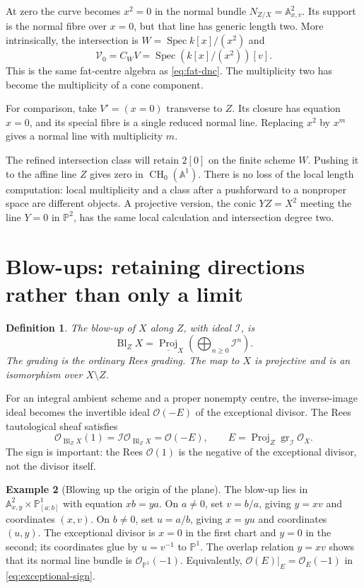 \documentclass[11pt,a4paper]{article}
\numberwithin{equation}{section}
\newtheorem{definition}{Definition}[section]
\theoremstyle{definition}
\newtheorem{example}[definition]{Example}
\newcommand{\A}{\mathbb A}
\newcommand{\PP}{\mathbb P}
\newcommand{\OO}{\mathcal O}
\newcommand{\Spec}{\operatorname{Spec}}
\newcommand{\Proj}{\operatorname{Proj}}
\newcommand{\gr}{\operatorname{gr}}
\newcommand{\Bl}{\operatorname{Bl}}
\newcommand{\CH}{\operatorname{CH}}
\begin{document}
At zero the curve becomes $x^2=0$ in the normal bundle
$N_{Z/X}=\A^2_{x,v}$. Its support is the normal fibre over $x=0$,
but that line has generic length two. More intrinsically, the
intersection is $W=\Spec k[x]/(x^2)$ and
\[
\mathcal V_0=C_WV=\Spec(k[x]/(x^2))[v].
\]
This is the same fat-centre algebra as \eqref{eq:fat-dnc}. The
multiplicity two has become the multiplicity of a cone component.

For comparison, take $V'=(x=0)$ transverse to $Z$. Its closure has
equation $x=0$, and its special fibre is a single reduced normal line.
Replacing $x^2$ by $x^m$ gives a normal line with multiplicity $m$.

The refined intersection class will retain $2[0]$ on the finite scheme
$W$. Pushing it to the affine line $Z$ gives zero in $\CH_0(\A^1)$.
There is no loss of the local length computation: local multiplicity
and a class after a pushforward to a nonproper space are different
objects. A projective version, the conic $YZ=X^2$ meeting the line
$Y=0$ in $\PP^2$, has the same local calculation and intersection
degree two.

\section{Blow-ups: retaining directions rather than only a limit}
\label{sec:blowup}

\begin{definition}
The blow-up of $X$ along $Z$, with ideal $\mathcal I$, is
\[
\Bl_ZX=\underline{\Proj}_X\left(\bigoplus_{n\ge0}\mathcal I^n\right).
\]
The grading is the ordinary Rees grading. The map to $X$ is projective
and is an isomorphism over $X\setminus Z$.
\end{definition}

For an integral ambient scheme and a proper nonempty centre, the
inverse-image ideal becomes the invertible ideal $\OO(-E)$ of the
exceptional divisor. The Rees tautological sheaf satisfies
\begin{equation}\label{eq:exceptional-sign}
\OO_{\Bl_ZX}(1)=\mathcal I\OO_{\Bl_ZX}=\OO(-E),
\qquad E=\Proj_Z\gr_{\mathcal I}\OO_X.
\end{equation}
The sign is important: the Rees $\OO(1)$ is the negative of the
exceptional divisor, not the divisor itself.

\begin{example}[Blowing up the origin of the plane]
The blow-up lies in $\A^2_{x,y}\times\PP^1_{[a:b]}$ with equation
$xb=ya$. On $a\ne0$, set $v=b/a$, giving $y=xv$ and coordinates
$(x,v)$. On $b\ne0$, set $u=a/b$, giving $x=yu$ and coordinates
$(u,y)$. The exceptional divisor is $x=0$ in the first chart and
$y=0$ in the second; its coordinates glue by $u=v^{-1}$ to $\PP^1$.
The overlap relation $y=xv$ shows that its normal line bundle is
$\OO_{\PP^1}(-1)$. Equivalently,
$\OO(E)|_E=\OO_E(-1)$ in \eqref{eq:exceptional-sign}.
\end{example}
\end{document}
